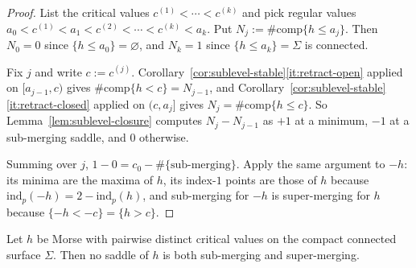 \begin{proof}
List the critical values $c^{(1)}<\cdots<c^{(k)}$ and pick regular values
$a_0<c^{(1)}<a_1<c^{(2)}<\cdots<c^{(k)}<a_k$.  Put
$N_j:=\#\mathrm{comp}\{h\le a_j\}$.  Then $N_0=0$ since
$\{h\le a_0\}=\varnothing$, and $N_k=1$ since $\{h\le a_k\}=\Sigma$ is
connected.

Fix $j$ and write $c:=c^{(j)}$.  Corollary~\ref{cor:sublevel-stable}\ref{it:retract-open}
applied on $[a_{j-1},c)$ gives
$\#\mathrm{comp}\{h<c\}=N_{j-1}$, and
Corollary~\ref{cor:sublevel-stable}\ref{it:retract-closed} applied on
$(c,a_j]$ gives $N_j=\#\mathrm{comp}\{h\le c\}$.  So
Lemma~\ref{lem:sublevel-closure} computes $N_j-N_{j-1}$ as $+1$ at a minimum,
$-1$ at a sub-merging saddle, and $0$ otherwise.

Summing over $j$, $1-0=c_0-\#\{\text{sub-merging}\}$.  Apply the same argument
to $-h$: its minima are the maxima of $h$, its index-$1$ points are those of
$h$ because $\mathrm{ind}_p(-h)=2-\mathrm{ind}_p(h)$, and sub-merging for $-h$
is super-merging for $h$ because $\{-h<-c\}=\{h>c\}$.
\end{proof}

\begin{lemma}\label{lem:merge-disjoint}
Let $h$ be Morse with pairwise distinct critical values on the compact
connected surface $\Sigma$.  Then no saddle of $h$ is both sub-merging and
super-merging.
\end{lemma}

